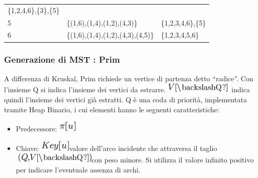 \documentclass{article}
\providecommand{\tightlist}{%
  \setlength{\itemsep}{0pt}\setlength{\parskip}{0pt}}
\begin{document}
\begin{longtable}[]{@{}lll@{}}
\begin{minipage}[t]{0.30\columnwidth}
{\{1,2,4,6\},\{3\},\{5\}}\strut
\end{minipage}\tabularnewline
\begin{minipage}[t]{0.30\columnwidth}\raggedright\strut
{5}\strut
\end{minipage} & \begin{minipage}[t]{0.30\columnwidth}\raggedright\strut
{\{(1,6),(1,4),(1,2),(4,3)\}}\strut
\end{minipage} & \begin{minipage}[t]{0.30\columnwidth}\raggedright\strut
{\{1,2,3,4,6\},\{5\}}\strut
\end{minipage}\tabularnewline
\begin{minipage}[t]{0.30\columnwidth}\raggedright\strut
{6}\strut
\end{minipage} & \begin{minipage}[t]{0.30\columnwidth}\raggedright\strut
{\{(1,6),(1,4),(1,2),(4,3),(4,5)\}}\strut
\end{minipage} & \begin{minipage}[t]{0.30\columnwidth}\raggedright\strut
{\{1,2,3,4,5,6\}}\strut
\end{minipage}\tabularnewline
\bottomrule
\end{longtable}

{}

\hypertarget{h.l5wypo8krmqc}{\subsubsection{\texorpdfstring{{Generazione
di MST : Prim}}{Generazione di MST : Prim}}\label{h.l5wypo8krmqc}}

{A differenza di Kruskal, Prim richiede un vertice di partenza detto
``radice''. Con l'insieme Q si indica l'insieme dei vertici da estrarre.
}\includegraphics{images/image485.png}{~indica quindi l'insieme dei
vertici già estratti. Q è una coda di priorità, implementata tramite
Heap Binario, i cui elementi hanno le seguenti caratteristiche:}

{}

\begin{itemize}
\tightlist
\item
  {Predecessore: }\includegraphics{images/image486.png}
\item
  {Chiave: }\includegraphics{images/image487.png}{valore dell'arco
  incidente che attraversa il
  taglio}\includegraphics{images/image488.png}{con peso minore. Si
  utilizza il valore infinito positivo per indicare l'eventuale assenza
  di archi.}
\end{itemize}
\end{document}
